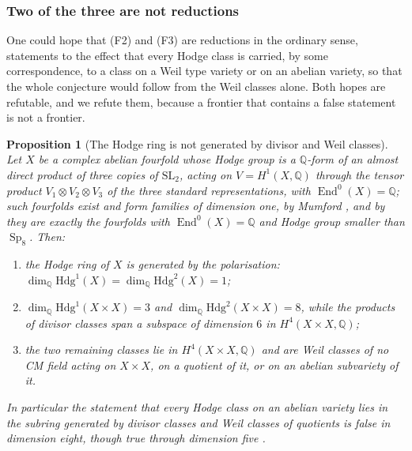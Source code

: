 \documentclass[11pt,reqno]{amsart}
\theoremstyle{plain}
\newtheorem{proposition}[theorem]{Proposition}
\theoremstyle{definition}
\theoremstyle{remark}
\newcommand{\QQ}{\mathbb{Q}}
\newcommand{\Hdg}{\mathrm{Hdg}}
\DeclareMathOperator{\End}{End}
\DeclareMathOperator{\Sp}{Sp}
\begin{document}
\subsubsection*{Two of the three are not reductions}

One could hope that (F2) and (F3) are reductions in the ordinary sense,
statements to the effect that every Hodge class is carried, by some
correspondence, to a class on a Weil type variety or on an abelian variety,
so that the whole conjecture would follow from the Weil classes alone. Both
hopes are refutable, and we refute them, because a frontier that contains a
false statement is not a frontier.

\begin{proposition}[The Hodge ring is not generated by divisor and Weil
classes]\label{prop:mumfordproduct}
Let $X$ be a complex abelian fourfold whose Hodge group is a $\QQ$-form of an
almost direct product of three copies of $\mathrm{SL}_{2}$, acting on
$V=H^{1}(X,\QQ)$ through the tensor product $V_{1}\otimes V_{2}\otimes V_{3}$
of the three standard representations, with $\End^{0}(X)=\QQ$; such
fourfolds exist and form families of dimension one, by Mumford
\cite{Mum69}, and by \cite[2.5(i)]{MZ99} they are exactly the fourfolds
with $\End^{0}(X)=\QQ$ and Hodge group smaller than $\Sp_{8}$. Then:
\begin{enumerate}[label=\textup{(\roman*)},nosep,leftmargin=2.6em]
\item the Hodge ring of $X$ is generated by the polarisation:
  $\dim_{\QQ}\Hdg^{1}(X)=\dim_{\QQ}\Hdg^{2}(X)=1$;
\item $\dim_{\QQ}\Hdg^{1}(X\times X)=3$ and $\dim_{\QQ}\Hdg^{2}(X\times X)=8$,
  while the products of divisor classes span a subspace of dimension $6$
  in $H^{4}(X\times X,\QQ)$;
\item the two remaining classes lie in $H^{4}(X\times X,\QQ)$ and are Weil
  classes of no CM field acting on $X\times X$, on a quotient of it, or on an
  abelian subvariety of it.
\end{enumerate}
In particular the statement that every Hodge class on an abelian variety
lies in the subring generated by divisor classes and Weil classes of
quotients is false in dimension eight, though true through dimension five
\cite{MZ99}.
\end{proposition}
\end{document}
